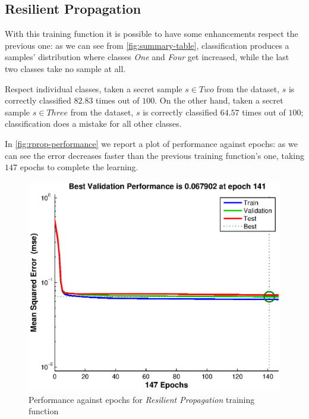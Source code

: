 \documentclass[10pt,a4paper]{article}
\begin{document}
    \subsection{Resilient Propagation}

    With this training function it is possible to have some enhancements respect the previous one: 
    as we can see from \autoref{fig:summary-table}, classification produces a samples' distribution
    where classes \emph{One} and \emph{Four} get increased, while the last two classes take no sample at all.

    Respect individual classes, taken a secret sample $s \in Two$ from the dataset, $s$ is correctly classified $82.83$ times out of $100$. 
    On the other hand, taken a secret sample $s \in Three$ from the dataset, $s$ is correctly classified $64.57$ times out of $100$;
    classification does a mistake for all other classes.

    In \autoref{fig:rprop-performance} we report a plot of performance against epochs: as we can
    see the error decreases faster than the previous training function's one, taking $147$ epochs to complete the learning.

    \begin{figure}
    \centering
    \includegraphics[scale=0.7]{eps/rprop-performance.eps}
    \caption{Performance against epochs for \emph{Resilient Propagation} training function}
    \label{fig:rprop-performance}
    \end{figure}
\end{document}
